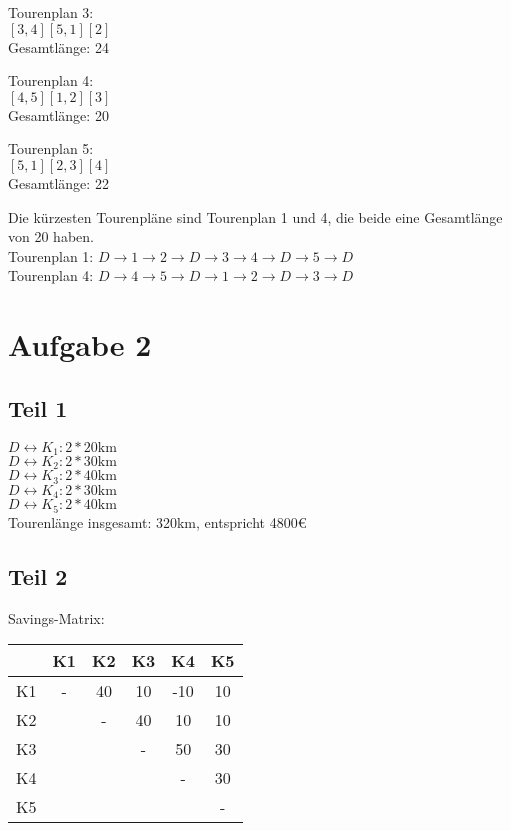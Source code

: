 \documentclass[a4paper,11pt]{article}
\begin{document}
Tourenplan 3: \\
$[3,4][5,1][2]$ \\
Gesamtlänge: 24 \newline

Tourenplan 4: \\
$[4,5][1,2][3]$ \\
Gesamtlänge: 20 \newline

Tourenplan 5: \\
$[5,1][2,3][4]$ \\
Gesamtlänge: 22 \newline

Die kürzesten Tourenpläne sind Tourenplan 1 und 4, die beide eine Gesamtlänge von 20 haben. \\
Tourenplan 1: $D \to 1 \to 2 \to D \to 3 \to 4 \to D \to 5 \to D$ \\
Tourenplan 4: $D \to 4 \to 5 \to D \to 1 \to 2 \to D \to 3 \to D$ \\

\section*{Aufgabe 2}

\subsection*{Teil 1}

$D \leftrightarrow K_1: 2 * 20\text{km}$ \\
$D \leftrightarrow K_2: 2 * 30\text{km}$ \\
$D \leftrightarrow K_3: 2 * 40\text{km}$ \\
$D \leftrightarrow K_4: 2 * 30\text{km}$ \\
$D \leftrightarrow K_5: 2 * 40\text{km}$ \\
Tourenlänge insgesamt: 320km, entspricht 4800€

\subsection*{Teil 2}

Savings-Matrix: \newline

\begin{tabular}{c|c|c|c|c|c}
   &  K1  &  K2  &  K3  &  K4  &  K5  \\ \hline
K1 &  -   &  40  &  10  & -10  &  10  \\ \hline
K2 &      &  -   &  40  &  10  &  10  \\ \hline
K3 &      &      &  -   &  50  &  30  \\ \hline
K4 &      &      &      &  -   &  30  \\ \hline
K5 &      &      &      &      &  - 
\end{tabular}
\end{document}
